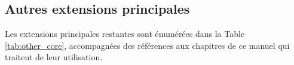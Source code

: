 
\subsection{Autres extensions principales}


Les extensions principales restantes sont énumérées dans la Table \ref{tab:other_core},
accompagnées des références aux chapitres de ce manuel qui traitent de leur
utilisation.


